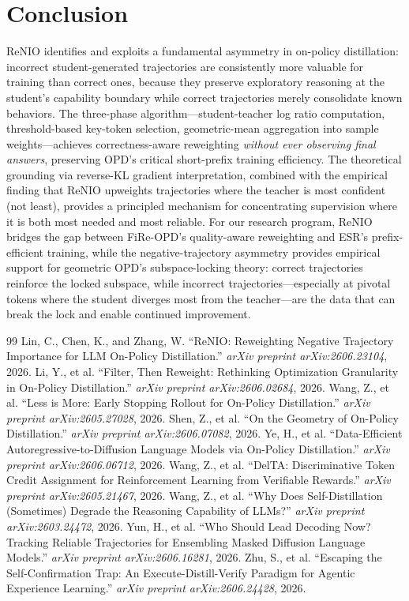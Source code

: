 \documentclass[11pt,a4paper]{article}
\begin{document}
\section{Conclusion}

ReNIO identifies and exploits a fundamental asymmetry in on-policy distillation: incorrect student-generated trajectories are consistently more valuable for training than correct ones, because they preserve exploratory reasoning at the student's capability boundary while correct trajectories merely consolidate known behaviors. The three-phase algorithm---student-teacher log ratio computation, threshold-based key-token selection, geometric-mean aggregation into sample weights---achieves correctness-aware reweighting \emph{without ever observing final answers}, preserving OPD's critical short-prefix training efficiency. The theoretical grounding via reverse-KL gradient interpretation, combined with the empirical finding that ReNIO upweights trajectories where the teacher is most confident (not least), provides a principled mechanism for concentrating supervision where it is both most needed and most reliable. For our research program, ReNIO bridges the gap between FiRe-OPD's quality-aware reweighting and ESR's prefix-efficient training, while the negative-trajectory asymmetry provides empirical support for geometric OPD's subspace-locking theory: correct trajectories reinforce the locked subspace, while incorrect trajectories---especially at pivotal tokens where the student diverges most from the teacher---are the data that can break the lock and enable continued improvement.

\begin{thebibliography}{99}
 Lin, C., Chen, K., and Zhang, W. ``ReNIO: Reweighting Negative Trajectory Importance for LLM On-Policy Distillation.'' \emph{arXiv preprint arXiv:2606.23104}, 2026.
 Li, Y., et al. ``Filter, Then Reweight: Rethinking Optimization Granularity in On-Policy Distillation.'' \emph{arXiv preprint arXiv:2606.02684}, 2026.
 Wang, Z., et al. ``Less is More: Early Stopping Rollout for On-Policy Distillation.'' \emph{arXiv preprint arXiv:2605.27028}, 2026.
 Shen, Z., et al. ``On the Geometry of On-Policy Distillation.'' \emph{arXiv preprint arXiv:2606.07082}, 2026.
 Ye, H., et al. ``Data-Efficient Autoregressive-to-Diffusion Language Models via On-Policy Distillation.'' \emph{arXiv preprint arXiv:2606.06712}, 2026.
 Wang, Z., et al. ``DelTA: Discriminative Token Credit Assignment for Reinforcement Learning from Verifiable Rewards.'' \emph{arXiv preprint arXiv:2605.21467}, 2026.
 Wang, Z., et al. ``Why Does Self-Distillation (Sometimes) Degrade the Reasoning Capability of LLMs?'' \emph{arXiv preprint arXiv:2603.24472}, 2026.
 Yun, H., et al. ``Who Should Lead Decoding Now? Tracking Reliable Trajectories for Ensembling Masked Diffusion Language Models.'' \emph{arXiv preprint arXiv:2606.16281}, 2026.
 Zhu, S., et al. ``Escaping the Self-Confirmation Trap: An Execute-Distill-Verify Paradigm for Agentic Experience Learning.'' \emph{arXiv preprint arXiv:2606.24428}, 2026.
\end{thebibliography}
\end{document}

